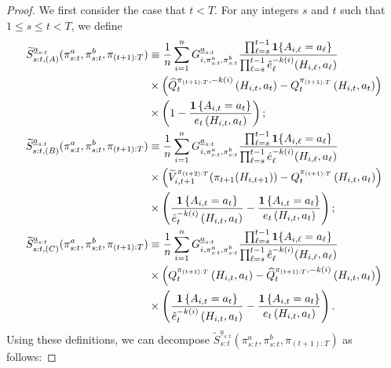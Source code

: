 \begin{proof}
We first consider the case that $t <T$. For any integers $s$ and $t$ such that $1\leq s\leq t < T$, we define
\begin{align*}
\widetilde{S}_{s:t,(A)}^{\underline{a}_{s:t}}(\pi_{s:t}^{a},\pi_{s:t}^{b},\pi_{(t+1):T})& \equiv \frac{1}{n}\sum_{i=1}^{n}
G_{i,\pi_{s:t}^{a},\pi_{s:t}^{b}}^{\underline{a}_{s:t}}
\frac{\prod_{\ell=s}^{t-1}\mathbf{1}\{A_{i,\ell}=a_{\ell}\}}{\prod_{\ell=s}^{t-1}\hat{e}_{\ell}^{-k(i)}(H_{i,\ell},a_{\ell})} \nonumber \\
&\times\left(\widehat{Q}_{t}^{\pi_{(t+1):T},-k(i)}\left(H_{i,t},a_{t}\right)-Q_{t}^{\pi_{(t+1):T}}\left(H_{i,t},a_{t}\right)\right) \nonumber\\
&\times \left(1-\frac{\mathbf{1}\left\{ A_{i,t}=a_{t}\right\} }{e_{t}\left(H_{i,t},a_{t}\right)}\right); \\
\widetilde{S}_{s:t,(B)}^{\underline{a}_{s:t}}(\pi_{s:t}^{a},\pi_{s:t}^{b},\pi_{(t+1):T})& \equiv \frac{1}{n}\sum_{i=1}^{n}G_{i,\pi_{s:t}^{a},\pi_{s:t}^{b}}^{\underline{a}_{s:t}}\frac{\prod_{\ell=s}^{t-1}\mathbf{1}\{A_{i,\ell}=a_{\ell}\}}{\prod_{\ell=s}^{t-1}\hat{e}_{\ell}^{-k(i)}(H_{i,\ell},a_{\ell})} \nonumber \\
	&\times\left(\widetilde{V}_{i,t+1}^{\pi_{(t+2):T}}(\pi_{t+1}(H_{i,t+1}))-Q_{t}^{\pi_{(t+1):T}}\left(H_{i,t},a_{t}\right)\right) \nonumber \\
 &\times \left(\frac{\mathbf{1}\left\{ A_{i,t}=a_{t}\right\} }{\hat{e}_{t}^{-k(i)}\left(H_{i,t},a_{t}\right)}-\frac{\mathbf{1}\left\{ A_{i,t}=a_{t}\right\} }{e_{t}\left(H_{i,t},a_{t}\right)}\right);  \\
\widetilde{S}_{s:t,(C)}^{\underline{a}_{s:t}}(\pi_{s:t}^{a},\pi_{s:t}^{b},\pi_{(t+1):T})& \equiv \frac{1}{n}\sum_{i=1}^{n}G_{i,\pi_{s:t}^{a},\pi_{s:t}^{b}}^{\underline{a}_{s:t}}\frac{\prod_{\ell=s}^{t-1}\mathbf{1}\{A_{i,\ell}=a_{\ell}\}}{\prod_{\ell=s}^{t-1}\hat{e}_{\ell}^{-k(i)}(H_{i,\ell},a_{\ell})} \nonumber \\
&\times\left(Q_{t}^{\pi_{(t+1):T}}\left(H_{i,t},a_{t}\right)-\widehat{Q}_{t}^{\pi_{(t+1):T},-k(i)}\left(H_{i,t},a_{t}\right)\right) \notag \\ 
&\times \left(\frac{\mathbf{1}\left\{ A_{i,t}=a_{t}\right\} }{\hat{e}_{t}^{-k(i)}\left(H_{i,t},a_{t}\right)}-\frac{\mathbf{1}\left\{ A_{i,t}=a_{t}\right\} }{e_{t}\left(H_{i,t},a_{t}\right)}\right).
\end{align*}
Using these definitions, we can decompose $\widetilde{S}_{s:t}^{\underline{a}_{s:t}}(\pi_{s:t}^{a},\pi_{s:t}^{b},\pi_{(t+1):T})$ as follows:

\end{proof}
